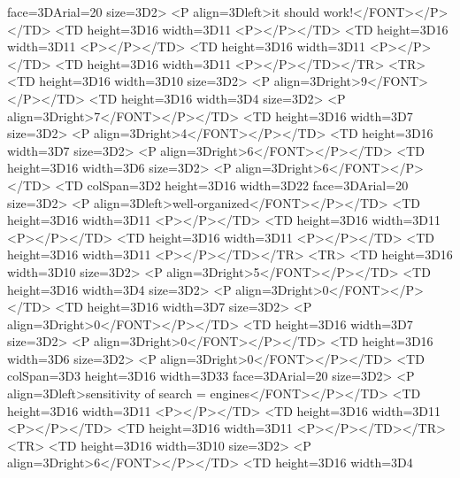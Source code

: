 face=3DArial=20
            size=3D2>
            <P align=3Dleft>it should work!</FONT></P></TD>
        <TD height=3D16 width=3D11%
            <P></P></TD>
        <TD height=3D16 width=3D11%
            <P></P></TD>
        <TD height=3D16 width=3D11%
            <P></P></TD>
        <TD height=3D16 width=3D11%
            <P></P></TD></TR>
    <TR>
        <TD height=3D16 width=3D10%
size=3D2>
            <P align=3Dright>9</FONT></P></TD>
        <TD height=3D16 width=3D4%
size=3D2>
            <P align=3Dright>7</FONT></P></TD>
        <TD height=3D16 width=3D7%
size=3D2>
            <P align=3Dright>4</FONT></P></TD>
        <TD height=3D16 width=3D7%
size=3D2>
            <P align=3Dright>6</FONT></P></TD>
        <TD height=3D16 width=3D6%
size=3D2>
            <P align=3Dright>6</FONT></P></TD>
        <TD colSpan=3D2 height=3D16 width=3D22%
face=3DArial=20
            size=3D2>
            <P align=3Dleft>well-organized</FONT></P></TD>
        <TD height=3D16 width=3D11%
            <P></P></TD>
        <TD height=3D16 width=3D11%
            <P></P></TD>
        <TD height=3D16 width=3D11%
            <P></P></TD>
        <TD height=3D16 width=3D11%
            <P></P></TD></TR>
    <TR>
        <TD height=3D16 width=3D10%
size=3D2>
            <P align=3Dright>5</FONT></P></TD>
        <TD height=3D16 width=3D4%
size=3D2>
            <P align=3Dright>0</FONT></P></TD>
        <TD height=3D16 width=3D7%
size=3D2>
            <P align=3Dright>0</FONT></P></TD>
        <TD height=3D16 width=3D7%
size=3D2>
            <P align=3Dright>0</FONT></P></TD>
        <TD height=3D16 width=3D6%
size=3D2>
            <P align=3Dright>0</FONT></P></TD>
        <TD colSpan=3D3 height=3D16 width=3D33%
face=3DArial=20
            size=3D2>
            <P align=3Dleft>sensitivity of search =
engines</FONT></P></TD>
        <TD height=3D16 width=3D11%
            <P></P></TD>
        <TD height=3D16 width=3D11%
            <P></P></TD>
        <TD height=3D16 width=3D11%
            <P></P></TD></TR>
    <TR>
        <TD height=3D16 width=3D10%
size=3D2>
            <P align=3Dright>6</FONT></P></TD>
        <TD height=3D16 width=3D4%
